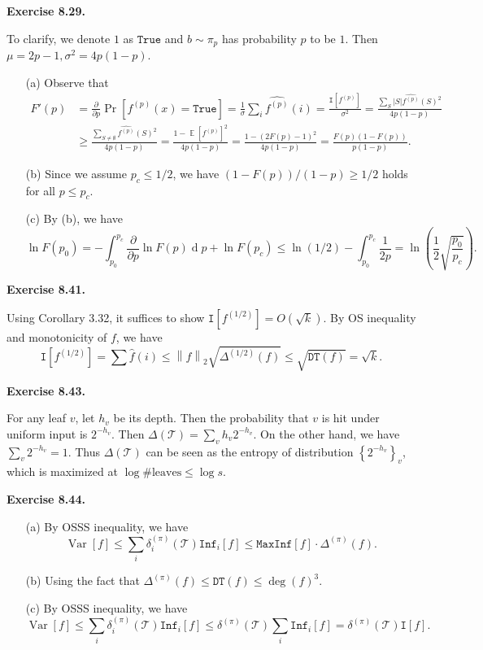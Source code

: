 \documentclass[a4paper]{article}
\newenvironment{exercise}[1]{
	\par
	\noindent\textbf{Exercise #1.}\quad
}{
	\par
	\bigskip
}
\DeclareMathOperator*{\E}{\mathbb E}
\DeclareMathOperator{\Var}{\mathrm{Var}}
\DeclareMathOperator{\sd}{\mathop{d}}
\newcommand{\vabs}[1]{{\left\| #1 \right\|}}
\newcommand{\pbra}[1]{{\left( #1 \right)}}
\newcommand{\cbra}[1]{{\left\{ #1 \right\}}}
\newcommand{\sbra}[1]{{\left[ #1 \right]}}
\newcommand{\Tcal}{\mathcal{T}}
\newcommand{\Inf}{\mathtt{Inf}}
\newcommand{\MaxInf}{\mathtt{MaxInf}}
\newcommand{\Itt}{\mathtt{I}}
\newcommand{\DT}{\mathtt{DT}}
\newcommand{\True}{\texttt{True}}
\begin{document}
\begin{exercise}{8.29}
    To clarify, we denote $1$ as $\True$ and $b\sim\pi_p$ has probability $p$ to be $1$. Then $\mu=2p-1,\sigma^2=4p(1-p)$.
    \begin{itemize}
        \item[(a)] Observe that
            \begin{align*}
            F'(p)
                &=\frac{\partial}{\partial p}\Pr\sbra{f^{(p)}(x)=\True}=\frac1{\sigma}\sum_i\widehat{f^{(p)}}(i)
                =\frac{\Itt\sbra{f^{(p)}}}{\sigma^2}=\frac{\sum_S|S|\widehat{f^{(p)}}(S)^2}{4p(1-p)}\\
                &\geq\frac{\sum_{S\neq\emptyset}\widehat{f^{(p)}}(S)^2}{4p(1-p)}
                =\frac{1-\E[f^{(p)}]^2}{4p(1-p)}
                =\frac{1-(2F(p)-1)^2}{4p(1-p)}
                =\frac{F(p)(1-F(p))}{p(1-p)}.
            \end{align*}
        \item[(b)] Since we assume $p_c\leq1/2$, we have $(1-F(p))/(1-p)\geq1/2$ holds for all $p\leq p_c$.
        \item[(c)] By (b), we have
            $$
            \ln F(p_0)=-\int_{p_0}^{p_c}\frac{\partial}{\partial p}\ln F(p)\sd p+\ln F(p_c)
            \leq\ln(1/2)-\int_{p_0}^{p_c}\frac1{2p}=\ln\pbra{\frac12\sqrt{\frac{p_0}{p_c}}}.
            $$
    \end{itemize}
\end{exercise}

\begin{exercise}{8.41}
    Using Corollary 3.32, it suffices to show $\Itt[f^{(1/2)}]=O(\sqrt k)$.
    By OS inequality and monotonicity of $f$, we have 
    $$
    \Itt[f^{(1/2)}]=\sum\hat f(i)\leq\vabs{f}_2\sqrt{\Delta^{(1/2)}(f)}\leq\sqrt{\DT(f)}=\sqrt k.
    $$
\end{exercise}

\begin{exercise}{8.43}
    For any leaf $v$, let $h_v$ be its depth. Then the probability that $v$ is hit under uniform input is $2^{-h_v}$.
    Then $\Delta(\Tcal)=\sum_vh_v2^{-h_v}$. On the other hand, we have $\sum_v2^{-h_v}=1$. Thus $\Delta(\Tcal)$ can be seen as the 
    entropy of distribution $\cbra{2^{-h_v}}_v$, which is maximized at $\log\#\text{leaves}\leq\log s$.
\end{exercise}

\begin{exercise}{8.44}
    \begin{itemize}
        \item[(a)] By OSSS inequality, we have 
            $$
            \Var[f]\leq\sum_i\delta_i^{(\pi)}(\Tcal)\Inf_i[f]\leq\MaxInf[f]\cdot\Delta^{(\pi)}(f).
            $$
        \item[(b)] Using the fact that $\Delta^{(\pi)}(f)\leq\DT(f)\leq\deg(f)^3$.
        \item[(c)] By OSSS inequality, we have
            $$
            \Var[f]\leq\sum_i\delta_i^{(\pi)}(\Tcal)\Inf_i[f]\leq\delta^{(\pi)}(\Tcal)\sum_i\Inf_i[f]=\delta^{(\pi)}(\Tcal)\Itt[f].
            $$
    \end{itemize}
\end{exercise}
\end{document}
